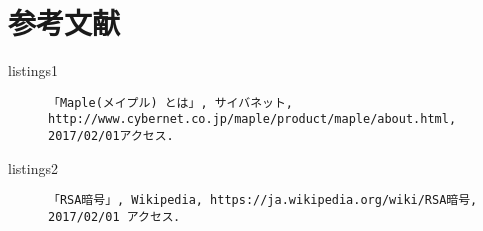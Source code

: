 \section{参考文献}\begin{description}
\item[listings1] \verb|「Maple(メイプル) とは」, サイバネット, http://www.cybernet.co.jp/maple/product/maple/about.html, 2017/02/01アクセス.|

\item[listings2] \verb|「RSA暗号」, Wikipedia, https://ja.wikipedia.org/wiki/RSA暗号, 2017/02/01 アクセス．|
\end{description}
